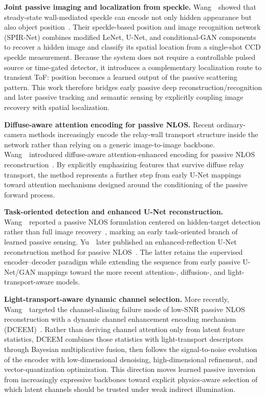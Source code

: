 \vspace{0.8mm}
\noindent \textbf{Joint passive imaging and localization from speckle.}
Wang~\etal~showed that steady-state wall-mediated speckle can encode not only hidden appearance but also object position~\cite{wangPassiveImagingLocalization2023}. Their speckle-based position and image recognition network (SPIR-Net) combines modified LeNet, U-Net, and conditional-GAN components to recover a hidden image and classify its spatial location from a single-shot CCD speckle measurement. Because the system does not require a controllable pulsed source or time-gated detector, it introduces a complementary localization route to transient ToF: position becomes a learned output of the passive scattering pattern. This work therefore bridges early passive deep reconstruction/recognition and later passive tracking and semantic sensing by explicitly coupling image recovery with spatial localization.

\vspace{0.8mm}
\noindent \textbf{Diffuse-aware attention encoding for passive NLOS.}
Recent ordinary-camera methods increasingly encode the relay-wall transport structure inside the network rather than relying on a generic image-to-image backbone. Wang~\etal~introduced diffuse-aware attention-enhanced encoding for passive NLOS reconstruction~\cite{wangDiffuseAwarePassive2026}. By explicitly emphasizing features that survive diffuse relay transport, the method represents a further step from early U-Net mappings toward attention mechanisms designed around the conditioning of the passive forward process.

\vspace{0.8mm}
\noindent \textbf{Task-oriented detection and enhanced U-Net reconstruction.}
Wang~\etal~reported a passive NLOS formulation centered on hidden-target detection rather than full image recovery~\cite{wangPassiveHiddenTargetDetection2024}, marking an early task-oriented branch of learned passive sensing. Yu~\etal~later published an enhanced-reflection U-Net reconstruction method for passive NLOS~\cite{yuEnhancedReflectionUNet2026}. The latter retains the supervised encoder--decoder paradigm while extending the sequence from early passive U-Net/GAN mappings toward the more recent attention-, diffusion-, and light-transport-aware models.

\vspace{0.8mm}
\noindent \textbf{Light-transport-aware dynamic channel selection.}
More recently, Wang~\etal~targeted the channel-aliasing failure mode of low-SNR passive NLOS reconstruction with a dynamic channel enhancement encoding mechanism (DCEEM)~\cite{wangDynamicChannelPNLOS2026}. Rather than deriving channel attention only from latent feature statistics, DCEEM combines those statistics with light-transport descriptors through Bayesian multiplicative fusion, then follows the signal-to-noise evolution of the encoder with low-dimensional denoising, high-dimensional refinement, and vector-quantization optimization. This direction moves learned passive inversion from increasingly expressive backbones toward explicit physics-aware selection of which latent channels should be trusted under weak indirect illumination.

